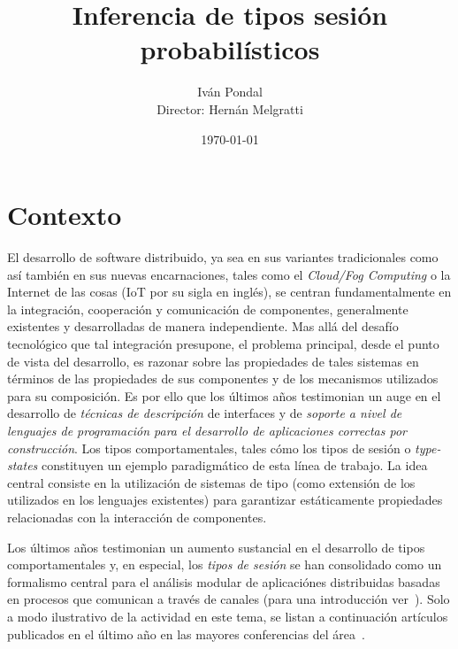 \documentclass{article}
\title{Inferencia de tipos sesión probabil\'isticos}
\author{
Iv\'an Pondal\\
Director: Hern\'an Melgratti
}
\date{\today}
\begin{document}
\maketitle


\newpage

\section*{Contexto}

El desarrollo de software distribuido, ya sea en sus variantes
tradicionales como as\'i tambi\'en en sus nuevas encarnaciones, tales como
el \emph{Cloud/Fog Computing} o la Internet de las
cosas (IoT por su sigla en ingl\'es), se centran fundamentalmente en
la integraci\'on, cooperaci\'on y comunicaci\'on de componentes,
generalmente existentes y desarrolladas de manera independiente.
%
Mas all\'a del desaf\'io tecnol\'ogico que tal integraci\'on
presupone, el problema principal, desde el punto de vista del
desarrollo, es  razonar sobre las propiedades de tales sistemas en
t\'erminos de las propiedades de sus componentes y de los 
mecanismos  utilizados para su composici\'on.
%
%
Es por ello que los \'ultimos a\~nos testimonian un auge en el
desarrollo de {\em t\'ecnicas de descripci\'on} de interfaces y de
{\em soporte a nivel de lenguajes de programaci\'on para el desarrollo
  de aplicaciones correctas por construcci\'on}.  Los tipos
comportamentales, tales c\'omo los tipos de sesi\'on o {\em type-states}
constituyen un ejemplo paradigm\'atico de esta l\'inea de trabajo. La
idea central consiste en la utilizaci\'on de sistemas de tipo (como
extensi\'on de los utilizados en los lenguajes existentes) para
garantizar est\'aticamente propiedades relacionadas con la
interacci\'on de componentes.
%

Los últimos años testimonian un aumento sustancial en el desarrollo de tipos comportamentales y, en 
especial, los {\em tipos de sesi\'on} se han
consolidado como un formalismo central para el an\'alisis modular de aplicaci\'ones distribuidas
 basadas en procesos que comunican a trav\'es de canales (para una introducci\'on ver~\cite{HuttelEtAl16}).
 Solo a modo ilustrativo de la actividad en este tema, se listan a continuaci\'on art\'iculos publicados en 
el \'ultimo a\~no en las mayores conferencias del \'area~\cite{DBLP:journals/pacmpl/GhilezanPPSY21,
DBLP:journals/pacmpl/HinrichsenBK20,
DBLP:journals/pacmpl/Castro-PerezY20,
DBLP:conf/ecoop/ImaiNYY19,
DBLP:conf/ecoop/000119,
DBLP:conf/esop/JongmansY20,
DBLP:conf/esop/VasconcelosCAM20,
DBLP:conf/concur/Horne20,
DBLP:conf/concur/DasP20,
DBHPS21,DBLP:conf/cc/Miu0Y021, DBLP:journals/pacmpl/GriesemerHKLTTW20,
DBLP:journals/pacmpl/MajumdarYZ20,
DBLP:conf/concur/InversoMPTT20}.
\end{document}
